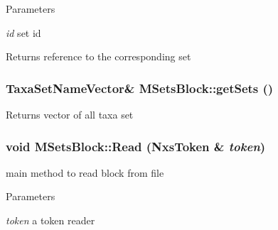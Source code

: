 \begin{DoxyParams}{Parameters}
\item[{\em id}]set id \end{DoxyParams}
\begin{DoxyReturn}{Returns}
reference to the corresponding set 
\end{DoxyReturn}
\hypertarget{classMSetsBlock_af7a44d6b45025b01b20ba612e72c2f4d}{
\subsubsection[{getSets}]{\setlength{\rightskip}{0pt plus 5cm}TaxaSetNameVector\& MSetsBlock::getSets ()}}
\label{classMSetsBlock_af7a44d6b45025b01b20ba612e72c2f4d}
\begin{DoxyReturn}{Returns}
vector of all taxa set 
\end{DoxyReturn}
\hypertarget{classMSetsBlock_ada321520d3bf38ec70c09e8e4568d2fd}{
\subsubsection[{Read}]{\setlength{\rightskip}{0pt plus 5cm}void MSetsBlock::Read ({\bf NxsToken} \& {\em token})}}
\label{classMSetsBlock_ada321520d3bf38ec70c09e8e4568d2fd}
main method to read block from file 
\begin{DoxyParams}{Parameters}
\item[{\em token}]a token reader \end{DoxyParams}


